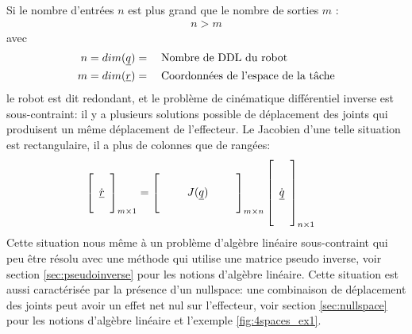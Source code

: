 Si le nombre d'entrées $n$ est plus grand que le nombre de sorties $m$ : 
\begin{align}
n > m
\end{align} 
avec 
\begin{align}
n &= dim(\underline{q}) = \quad\text{Nombre de DDL du robot} \\
m &= dim(\underline{r}) = \quad\text{Coordonnées de l'espace de la tâche} 
\end{align} 
le robot est dit redondant, et le problème de cinématique différentiel inverse est sous-contraint: il y a plusieurs solutions possible de déplacement des joints qui produisent un même déplacement de l'effecteur. Le Jacobien d'une telle situation est rectangulaire, il a plus de colonnes que de rangées:
\begin{align}
\left[ \begin{array}{c}  \\ \dot{\underline{r}} \\ \\
\end{array} \right]_{m \times 1}
&= 
\left[ \begin{array}{c c c c c} 
&&&&\\
&& J(\underline{q}) &&\\
&&&&
\end{array} \right]_{m \times n}
\left[ \begin{array}{c} 
\\ \\ \dot{\underline{q}} \\ \\ \\
\end{array} \right]_{n \times 1}
\label{eq:underconstraintdiffkin}
\end{align} 
Cette situation nous même à un problème d'algèbre linéaire sous-contraint qui peu être résolu avec une méthode qui utilise une matrice pseudo inverse, voir section \ref{sec:pseudoinverse} pour les notions d'algèbre linéaire. Cette situation est aussi caractérisée par la présence d'un nullspace: une combinaison de déplacement des joints peut avoir un effet net nul sur l'effecteur, voir section \ref{sec:nullspace} pour les notions d'algèbre linéaire et l'exemple \ref{fig:4spaces_ex1}. 

